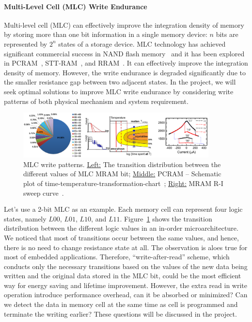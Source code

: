 \paragraph{Multi-Level Cell (MLC) Write Endurance} Multi-level cell (MLC) can effectively improve the integration density of memory by storing more than one bit information in a single memory device: $n$ bits are represented by  $2^n$ states of a storage device. MLC technology has achieved significant commercial success in NAND flash memory~\cite{Park04} and it has been explored in PCRAM~\cite{Raoux08,Bedeschi09}, STT-RAM~\cite{Lou08}, and RRAM~\cite{Baek05}. It can effectively improve the integration density of memory. However, the write endurance is degraded significantly due to the smaller resistance gap between two adjacent states. In the project, we will seek optimal solutions to improve MLC write endurance by considering write patterns of both physical mechanism and system requirement.

\begin{figure}
\centering
\vspace{-10pt}
\includegraphics[width=0.9\textwidth]{./figure/4_mlc.pdf}
\vspace{-10pt}
\caption{MLC write patterns. \underline{Left:} The transition distribution between the different values of MLC MRAM bit; \underline{Middle:} PCRAM -- Schematic plot of time-temperature-transformation-chart~\cite{Nirschl07}; \underline{Right:} MRAM R-I sweep curve~\cite{Lou08}.}
\label{mlc}
\vspace{-10pt}
\end{figure}

Let's use a 2-bit MLC as an example. Each memory cell can represent four logic states, namely $L00$, $L01$, $L10$, and $L11$.  Figure~\ref{mlc} shows the transition distribution between the different logic values in an in-order microarchitecture. We noticed that most of transitions occur between the same values, and hence, there is no need to change resistance state at all. The observation is aloes true for most of embedded applications. Therefore, ``write-after-read'' scheme, which conducts only the necessary transitions based on the values of the new data being written and the original data stored in the MLC bit, could be the most efficient way for energy saving and lifetime improvement. However, the extra read in write operation introduce performance overhead, can it be absorbed or minimized? Can we detect the data in memory cell at the same time as cell is programmed and terminate the writing earlier? These questions will be discussed in the project.

